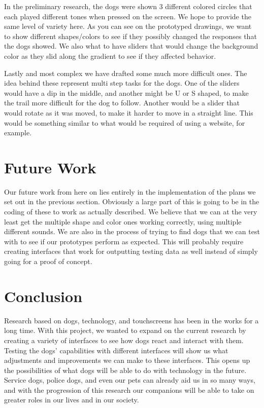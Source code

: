 \documentclass[conference]{IEEEtran}
\begin{document}
        In the preliminary research, the dogs were shown 3 different colored circles that each played different tones when pressed on the screen. We hope to provide the same level of variety here. As you can see on the prototyped drawings, we want to show different shapes/colors to see if they possibly changed the responses that the dogs showed. We also what to have sliders that would change the background color as they slid along the gradient to see if they affected behavior.

        Lastly and most complex we have drafted some much more difficult ones. The idea behind these represent multi step tasks for the dogs. One of the sliders would have a dip in the middle, and another might be U or S shaped, to make the trail more difficult for the dog to follow. Another would be a slider that would rotate as it was moved, to make it harder to move in a straight line. This would be something similar to what would be required of using a website, for example.
    
    \section{Future Work}
        Our future work from here on lies entirely in the implementation of the plans we set out in the previous section. Obviously a large part of this is going to be in the coding of these to work as actually described. We believe that we can at the very least get the multiple shape and color ones working correctly, using multiple different sounds. We are also in the process of trying to find dogs that we can test with to see if our prototypes perform as expected. This will probably require creating interfaces that work for outputting testing data as well instead of simply going for a proof of concept.
    
    \section{Conclusion}
        Research based on dogs, technology, and touchscreens has been in the works for a long time. With this project, we wanted to expand on the current research by creating a variety of interfaces to see how dogs react and interact with them. Testing the dogs’ capabilities with different interfaces will show us what adjustments and improvements we can make to these interfaces. This opens up the possibilities of what dogs will be able to do with technology in the future. Service dogs, police dogs, and even our pets can already aid us in so many ways, and with the progression of this research our companions will be able to take on greater roles in our lives and in our society.

    
    
\end{document}
